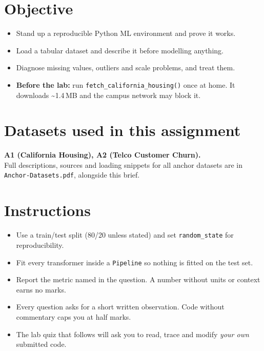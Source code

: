 \documentclass[11pt,a4paper]{article}
\begin{document}

\section*{Objective}

\begin{itemize}[leftmargin=*]

  \item Stand up a reproducible Python ML environment and prove it works.

  \item Load a tabular dataset and describe it before modelling anything.

  \item Diagnose missing values, outliers and scale problems, and treat them.

  \item \textbf{Before the lab:} run \texttt{fetch\_california\_housing()} once at home. It downloads \textasciitilde1.4\,MB and the campus network may block it.

\end{itemize}

\section*{Datasets used in this assignment}

\textbf{A1 (California Housing), A2 (Telco Customer Churn).}\\ Full descriptions, sources and loading snippets for all anchor datasets are in \texttt{Anchor-Datasets.pdf}, alongside this brief.

\section*{Instructions}

\begin{itemize}[leftmargin=*]

  \item Use a train/test split (80/20 unless stated) and set \texttt{random\_state} for reproducibility.

  \item Fit every transformer inside a \texttt{Pipeline} so nothing is fitted on the test set.

  \item Report the metric named in the question. A number without units or context earns no marks.

  \item Every question asks for a short written observation. Code without commentary caps you at half marks.

  \item The lab quiz that follows will ask you to read, trace and modify \emph{your own} submitted code.

\end{itemize}
\end{document}
